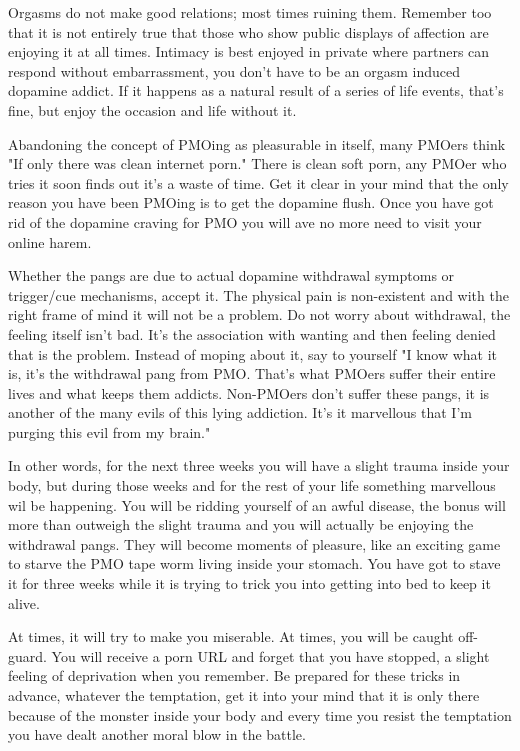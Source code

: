 Orgasms do not make good relations; most times ruining them. Remember too that it is not entirely true that those who show public displays of affection are enjoying it at all times. Intimacy is best enjoyed in private where partners can respond without embarrassment, you don't have to be an orgasm induced dopamine addict. If it happens as a natural result of a series of life events, that's fine, but enjoy the occasion and life without it.

Abandoning the concept of PMOing as pleasurable in itself, many PMOers think "If only there was clean internet porn." There is clean soft porn, any PMOer who tries it soon finds out it's a waste of time. Get it clear in your mind that the only reason you have been PMOing is to get the dopamine flush. Once you have got rid of the dopamine craving for PMO you will ave no more need to visit your online harem.

Whether the pangs are due to actual dopamine withdrawal symptoms or trigger/cue mechanisms, accept it. The physical pain is non-existent and with the right frame of mind it will not be a problem. Do not worry about withdrawal, the feeling itself isn't bad. It's the association with wanting and then feeling denied that is the problem. Instead of moping about it, say to yourself "I know what it is, it's the withdrawal pang from PMO. That's what PMOers suffer their entire lives and what keeps them addicts. Non-PMOers don't suffer these pangs, it is another of the many evils of this lying addiction. It's it marvellous that I'm purging this evil from my brain."

In other words, for the next three weeks you will have a slight trauma inside your body, but during those weeks and for the rest of your life something marvellous wil be happening. You will be ridding yourself of an awful disease, the bonus will more than outweigh the slight trauma and you will actually be enjoying the withdrawal pangs. They will become moments of pleasure, like an exciting game to starve the PMO tape worm living inside your stomach. You have got to stave it for three weeks while it is trying to trick you into getting into bed to keep it alive.

At times, it will try to make you miserable. At times, you will be caught off-guard. You will receive a porn URL and forget that you have stopped, a slight feeling of deprivation when you remember. Be prepared for these tricks in advance, whatever the temptation, get it into your mind that it is only there because of the monster inside your body and every time you resist the temptation you have dealt another moral blow in the battle.

